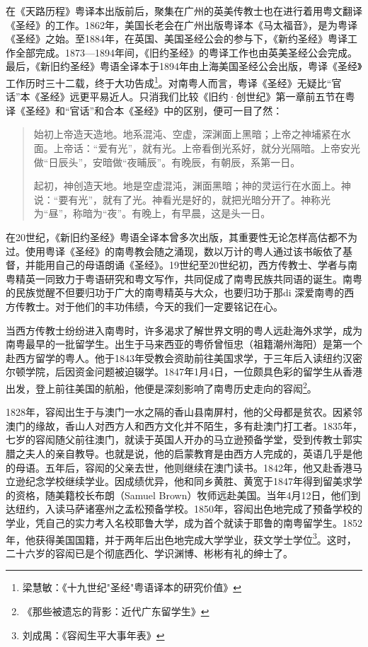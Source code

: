 在《天路历程》粤译本出版前后，聚集在广州的英美传教士也在进行着用粤文翻译《圣经》的工作。1862年，美国长老会在广州出版粤译本《马太福音》，是为粤译《圣经》之始。至1884年，在英国、美国圣经公会的参与下，《新约圣经》粤译工作全部完成。1873—1894年间，《旧约圣经》的粤译工作也由英美圣经公会完成。最后，《新旧约圣经》粤语全译本于1894年由上海美国圣经公会出版，粤译《圣经》工作历时三十二载，终于大功告成\footnote{梁慧敏：《十九世纪"圣经"粤语译本的研究价值》}。对南粤人而言，粤译《圣经》无疑比“官话”本《圣经》远更平易近人。只消我们比较《旧约·创世纪》第一章前五节在粤译《圣经》和“官话”和合本《圣经》中的区别，便可一目了然：

\begin{quote}

始初上帝造天造地。地系混沌、空虚，深渊面上黑暗；上帝之神埔紧在水面。上帝话：“爱有光”，就有光。上帝看倒光系好，就分光隔暗。上帝安光做“日辰头”，安暗做“夜晡辰”。有晚辰，有朝辰，系第一日。

起初，神创造天地。地是空虚混沌，渊面黑暗；神的灵运行在水面上。神说：“要有光”，就有了光。神看光是好的，就把光暗分开了。神称光为“昼”，称暗为“夜”。有晚上，有早晨，这是头一日。
\end{quote}


在20世纪，《新旧约圣经》粤语全译本曾多次出版，其重要性无论怎样高估都不为过。使用粤译《圣经》的南粤教会随之涌现，数以万计的粤人通过该书皈依了基督，并能用自己的母语朗诵《圣经》。19世纪至20世纪初，西方传教士、学者与南粤精英一同致力于粤语研究和粤文写作，共同促成了南粤民族共同语的诞生。南粤的民族觉醒不但要归功于广大的南粤精英与大众，也要归功于那di 深爱南粤的西方传教士。对于他们的丰功伟绩，今天的我们一定要铭记在心。

当西方传教士纷纷进入南粤时，许多渴求了解世界文明的粤人远赴海外求学，成为南粤最早的一批留学生。出生于马来西亚的粤侨曾恒忠（祖籍潮州海阳）是第一个赴西方留学的粤人。他于1843年受教会资助前往美国求学，于三年后入读纽约汉密尔顿学院，后因资金问题被迫辍学。1847年1月4日，一位颇具色彩的留学生从香港出发，登上前往美国的航船，他便是深刻影响了南粤历史走向的容闳\footnote{《那些被遗忘的背影：近代广东留学生》}。

1828年，容闳出生于与澳门一水之隔的香山县南屏村，他的父母都是贫农。因紧邻澳门的缘故，香山人对西方人和西方文化并不陌生，多有赴澳门打工者。1835年，七岁的容闳随父前往澳门，就读于英国人开办的马立逊预备学堂，受到传教士郭实腊之夫人的亲自教导。也就是说，他的启蒙教育是由西方人完成的，英语几乎是他的母语。五年后，容闳的父亲去世，他则继续在澳门读书。1842年，他又赴香港马立逊纪念学校继续学业。因成绩优异，他和同乡黄胜、黄宽于1847年得到留美求学的资格，随美籍校长布朗（Samuel Brown）牧师远赴美国。当年4月12日，他们到达纽约，入读马萨诸塞州之孟松预备学校。1850年，容闳出色地完成了预备学校的学业，凭自己的实力考入名校耶鲁大学，成为首个就读于耶鲁的南粤留学生。1852年，他获得美国国籍，并于两年后出色地完成大学学业，获文学士学位\footnote{刘成禺：《容闳生平大事年表》}。这时，二十六岁的容闳已是个彻底西化、学识渊博、彬彬有礼的绅士了。

